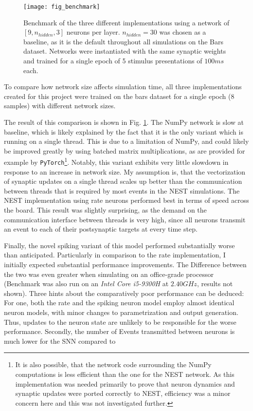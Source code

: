 \begin{figure}[t]
    \centering
    \texttt{[image: fig\_benchmark]}
    \caption{Benchmark of the three different implementations using a network of $[9, n_{hidden}, 3]$ neurons per layer.
        $n_{hidden}=30$ was chosen as a baseline, as it is the default throughout all simulations on the Bars dataset.
        Networks were instantiated with the same synaptic weights and trained for a single epoch of 5 stimulus
        presentations of $100ms$ each.}
    \label{fig-benchmark}
\end{figure}


To compare how network size affects simulation time, all three implementations created for this project were trained
on the bars dataset for a single epoch (8 samples) with different network sizes.

The result of this comparison is shown in Fig. \ref{fig-benchmark}. The NumPy network is slow at baseline, which is
likely explained by the fact that it is the only variant which is running on a single thread. This is due to a
limitation of NumPy, and could likely be improved greatly by using batched matrix multiplications, as are provided for
example by \texttt{PyTorch}\footnote{It is also possible, that the network code surrounding the NumPy computations is
    less efficient than the one for the NEST network. As this implementation was needed primarily to prove that neuron
    dynamics and synaptic updates were ported correctly to NEST, efficiency was a minor concern here and this was not
    investigated further.}.  Notably, this variant exhibits very little slowdown in response to an increase in network size.
My assumption is, that the vectorization of synaptic updates on a single thread scales up better than the communication
between threads that is required by most events in the NEST simulations. The NEST implementation using rate neurons
performed best in terms of speed across the board. This result was slightly surprising, as the demand on the
communication interface between threads is very high, since all neurons transmit an event to each of their postsynaptic
targets at every time step.

Finally, the novel spiking variant of this model performed substantially worse than anticipated. Particularly in
comparison to the rate implementation, I initially expected substantial performance improvements. The Difference between
the two was even greater when simulating on an office-grade processor (Benchmark was also run on an \textit{Intel Core
    i5-9300H} at $2.40GHz$, results not shown). Three hints about the comparatively poor performance can be deduced: For
one, both the rate and the spiking neuron model employ almost identical neuron models, with minor changes to
parametrization and output generation. Thus, updates to the neuron state are unlikely to be responsible for the worse
performance. Secondly, the number of Events transmitted between neurons is much lower for the SNN compared to

